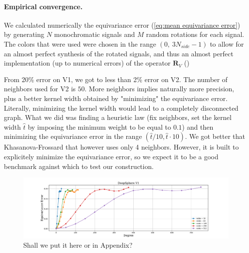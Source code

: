 \documentclass{article} %
\renewcommand{\b}[1]{{\bm{#1}}}   %
\newcommand{\mart}[1]{{\color[rgb]{.9,.5,.3}{#1}}}
\begin{document}
\paragraph{Empirical convergence.}

We calculated numerically the equivariance error (\ref{eq:mean equivariance error}) by generating $N$ monochromatic signals and $M$ random rotations for each signal. The colors that were used were chosen in the range $(0,\  3N_{side}-1)$ to allow for an almost perfect synthesis of the rotated signals, and thus an almost perfect implementation (up to numerical errors) of the operator $\b{R}_V$ (\cite{healpix_primer})

From 20\% error on V1, we got to less than 2\% error on V2. The number of neighbors used for V2 is $50$. More neighbors implies naturally more precision, plus a better kernel width obtained by "minimizing" the equivariance error. \mart{How to explain how we found the kernel width? Micha\"el I need your help here!!} Literally, minimizing the kernel width would lead to a completely disconnected graph. What we did was finding a heuristic law (fix neighbors, set the kernel width $\hat t$ by imposing the minimum weight to be equal to $0.1$) and then minimizing the equivariance error in the range $(\hat t / 10, \hat t\cdot 10) $. We got better that Khasanova-Frossard \mart{(check the code)} that however uses only 4 neighbors. However, it is built to explicitely minimize the equivariance error, so we expect it to be a good benchmark against which to test our construction.
\begin{figure}
	\centering
	\includegraphics[width=0.9\linewidth]{DeepSphereV1}
	\caption{Shall we put it here or in Appendix?
	}
	\label{fig:deepsphereV1}
\end{figure}
\end{document}
